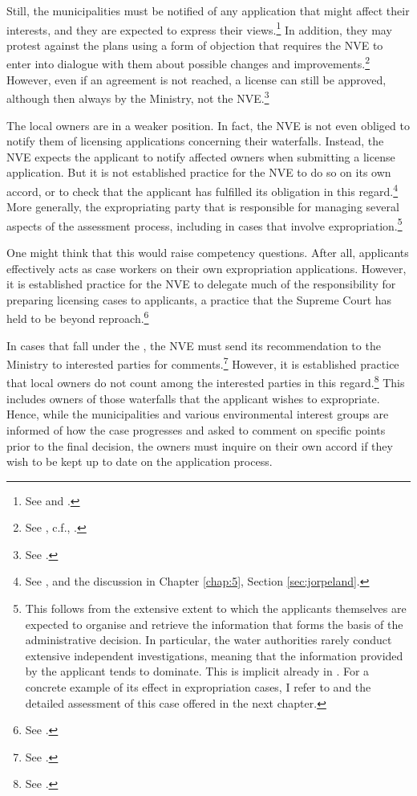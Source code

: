 Still, the municipalities must be notified of any application that might affect their interests, and they are expected to express their views.\footnote{See \cite[8]{wra17} and \cite[24]{wra00}.} In addition, they may protest against the plans using a form of objection that requires the NVE to enter into dialogue with them about possible changes and improvements.\footnote{See \cite[5-4,5-6]{pb08}, c.f., \cite[24]{wra00}.} However, even if an agreement is not reached, a license can still be approved, although then always by the Ministry, not the NVE.\footnote{See \cite[5-6]{pb08}.}

The local owners are in a weaker position. In fact, the NVE is not even obliged to notify them of licensing applications concerning their waterfalls. Instead, the NVE expects the applicant to notify affected owners when submitting a license application. But it is not established practice for the NVE to do so on its own accord, or to check that the applicant has fulfilled its obligation in this regard.\footnote{See \cite{jorpeland11}, and the discussion in Chapter \ref{chap:5}, Section \ref{sec:jorpeland}.} More generally, the expropriating party that is responsible for managing several aspects of the assessment process, including in cases that involve expropriation.\footnote{This follows from the extensive extent to which the applicants themselves are expected to organise and retrieve the information that forms the basis of the administrative decision. In particular, the water authorities rarely conduct extensive independent investigations, meaning that the information provided by the applicant tends to dominate. This is implicit already in \cite{stokker10}. For a concrete example of its effect in expropriation cases, I refer to \cite{jorpeland11} and the detailed assessment of this case offered in the next chapter.}

One might think that this would raise competency questions. After all, applicants effectively acts as case workers on their own expropriation applications. However, it is established practice for the NVE to delegate much of the responsibility for preparing licensing cases to applicants, a practice that the Supreme Court has held to be beyond reproach.\footnote{See \cite{jorpeland11}.}

In cases that fall under the \cite{wra17}, the NVE must send its recommendation to the Ministry to interested parties for comments.\footnote{See \cite[6]{wra17}.} However, it is established practice that local owners do not count among the interested parties in this regard.\footnote{See \cite{jorpeland11}.} This includes owners of those waterfalls that the applicant wishes to expropriate. Hence, while the municipalities and various environmental interest groups are informed of how the case progresses and asked to comment on specific points prior to the final decision, the owners must inquire on their own accord if they wish to be kept up to date on the application process.

